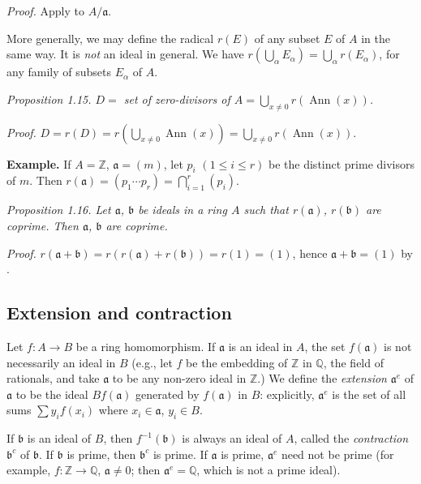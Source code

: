 \noindent\textit{Proof.} Apply  to $A/\mathfrak a$. \proofbox

More generally, we may define the radical $r(E)$ of any subset $E$ of $A$ in the same way. It is \textit{not} an ideal in general. We have $r(\bigcup_\alpha E_\alpha)=\bigcup_\alpha r(E_\alpha)$, for any family of subsets $E_\alpha$ of $A$.

\noindent\textit{Proposition 1.15. $D={}$ set of zero-divisors of $A=\bigcup_{x\neq0}r(\operatorname{Ann}(x))$.}

\noindent\textit{Proof.} $D=r(D)=r(\bigcup_{x\neq0}\operatorname{Ann}(x))=\bigcup_{x\neq0}r(\operatorname{Ann}(x))$. \proofbox

\noindent\textbf{Example.} If $A=\mathbb Z$, $\mathfrak a=(m)$, let $p_i$ $(1\leq i\leq r)$ be the distinct prime divisors of $m$. Then $r(\mathfrak a)=(p_1\cdots p_r)=\bigcap_{i=1}^r(p_i)$.

\noindent\textit{Proposition 1.16. Let $\mathfrak a$, $\mathfrak b$ be ideals in a ring $A$ such that $r(\mathfrak a)$, $r(\mathfrak b)$ are coprime. Then $\mathfrak a$, $\mathfrak b$ are coprime.}

\noindent\textit{Proof.} $r(\mathfrak a+\mathfrak b)=r(r(\mathfrak a)+r(\mathfrak b))=r(1)=(1)$, hence $\mathfrak a+\mathfrak b=(1)$ by .

\subsection{Extension and contraction}

Let $f:A\longrightarrow B$ be a ring homomorphism. If $\mathfrak a$ is an ideal in $A$, the set $f(\mathfrak a)$ is not necessarily an ideal in $B$ (e.g., let $f$ be the embedding of $\mathbb Z$ in $\mathbb Q$, the field of rationals, and take $\mathfrak a$ to be any non-zero ideal in $\mathbb Z$.) We define the \textit{extension} $\mathfrak a^e$ of $\mathfrak a$ to be the ideal $Bf(\mathfrak a)$ generated by $f(\mathfrak a)$ in $B$: explicitly, $\mathfrak a^e$ is the set of all sums $\sum y_i f(x_i)$ where $x_i\in\mathfrak a$, $y_i\in B$.

If $\mathfrak b$ is an ideal of $B$, then $f^{-1}(\mathfrak b)$ is always an ideal of $A$, called the \textit{contraction} $\mathfrak b^c$ of $\mathfrak b$. If $\mathfrak b$ is prime, then $\mathfrak b^c$ is prime. If $\mathfrak a$ is prime, $\mathfrak a^e$ need not be prime (for example, $f:\mathbb Z\longrightarrow\mathbb Q$, $\mathfrak a\neq0$; then $\mathfrak a^e=\mathbb Q$, which is not a prime ideal).

